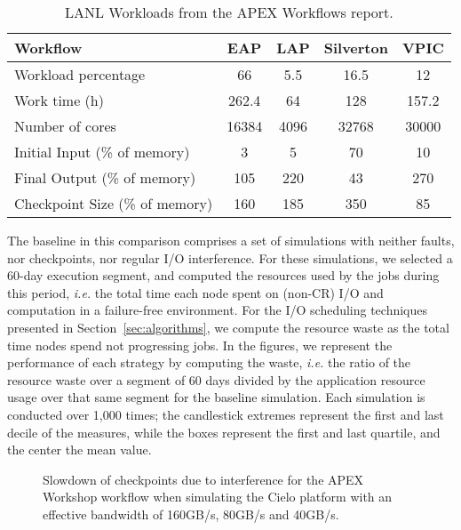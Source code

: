 \documentclass[conference,nofonttune]{IEEEtran}
\newcommand{\ie}[0]{\emph{i.e.}\xspace}
\begin{document}
\begin{table}
\centering
{\scriptsize
\begin{tabular}{|l|c|c|c|c|}
\hline
 Workflow & EAP & LAP & Silverton & VPIC \\\hline
Workload percentage & 66 & 5.5 & 16.5 & 12 \\\hline
Work time (h) & 262.4 & 64 & 128 & 157.2 \\\hline
Number of cores & 16384 & 4096 & 32768 & 30000 \\\hline
Initial Input (\% of memory) &  3 & 5 & 70 & 10 \\\hline
Final Output (\% of memory) & 105 & 220 & 43 & 270 \\\hline
Checkpoint Size (\% of memory) & 160 & 185 & 350 & 85 \\\hline
\end{tabular}
}
\caption{LANL Workloads from the APEX Workflows report.\label{table:lanl}}
\end{table}

The baseline in this comparison comprises a set of simulations with neither faults, 
nor checkpoints, nor regular I/O interference. For these simulations, we selected a 60-day
execution segment, and computed the resources used by the jobs during this
period, \ie the total time each node spent on (non-CR) I/O and computation in a
failure-free environment.
For the I/O scheduling techniques presented in Section~\ref{sec:algorithms}, we
compute the resource waste as the total time nodes spend not progressing jobs.
In the figures, we represent the performance of each strategy by
computing the waste, \ie the ratio of the resource waste over a segment of 60 days
divided by the application resource usage over that same segment for the
baseline simulation. Each simulation is conducted over 1,000 times; the
candlestick extremes represent the first and last decile of the measures, while
the boxes represent the first and last quartile, and the center the mean value.

\begin{figure}[t]
  \begin{center}
    \resizebox{1.05\linewidth}{!}{}
 \end{center}
    \caption{\label{fig:ckps-slow}Slowdown of checkpoints due to
      interference for the APEX Workshop workflow when simulating the
      Cielo platform with an effective bandwidth of 160GB/s, 80GB/s
      and 40GB/s.}
 \end{figure}
\end{document}
